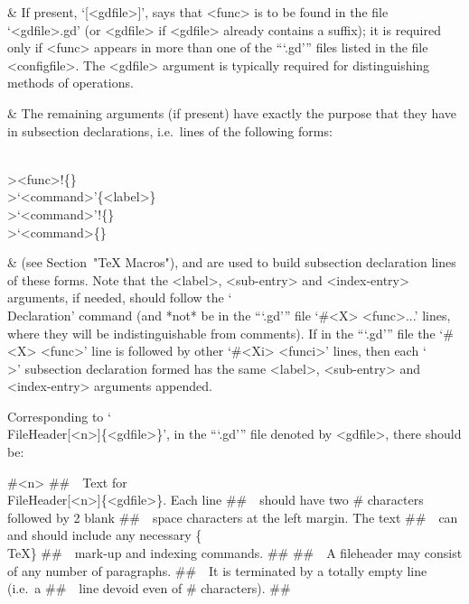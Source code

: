 &
If present, `[<gdfile>]', says that <func> is to be  found  in  the  file
`<gdfile>.gd' (or <gdfile> if <gdfile> already contains a suffix); it  is
required only if <func> appears in more than one of the  ```.gd'''  files
listed in the file  <configfile>.  The  <gdfile>  argument  is  typically
required for distinguishing methods of operations.

&
The remaining arguments (if present) have exactly the purpose  that  they
have  in subsection   declarations, i.e.~lines of the following forms:

\)\\><func>!\{<sub-entry>\}
\)\\>\lq<command>\rq\{<label>\}
\)\\>\lq<command>\rq!\{<sub-entry>\}
\)\\>\lq<command>\rq@\{<index-entry>\}

&
(see Section~"TeX Macros"), and are used to build subsection  declaration
lines  of  these  forms.  Note  that   the   <label>,   <sub-entry>   and
<index-entry> arguments, if needed,  should  follow  the  `\\Declaration'
command (and *not* be in the  ```.gd'''  file  `\#<X>  <func>...'  lines,
where they will be indistinguishable from comments). If in the  ```.gd'''
file the `\#<X> <func>' line is followed by other `\#<Xi> <funci>' lines,
then each `\\>' subsection  declaration  formed  has  the  same  <label>,
<sub-entry> and <index-entry> arguments appended.

\enditems

Corresponding to `\\FileHeader[<n>]\{<gdfile>\}', in the  ```.gd'''  file
denoted by <gdfile>, there should be:

\)\#<n>
\)\#\#\ \ Text for \\FileHeader[<n>]\{<gdfile>\}. Each line
\)\#\#\ \ should have two \# characters followed by 2 blank
\)\#\#\ \ space characters at the left margin. The text
\)\#\#\ \ can and should include any necessary \{\\TeX\}
\)\#\#\ \ mark-up and indexing commands. 
\)\#\#
\)\#\#\ \ A fileheader may consist of any number of paragraphs.
\)\#\#\ \ It is terminated by a totally empty line (i.e.~a 
\)\#\#\ \ line devoid even of \# characters).
\)\#\#

